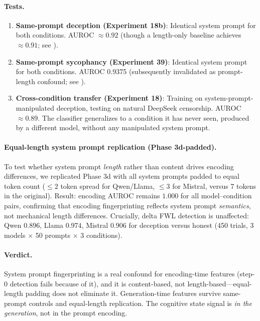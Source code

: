 \paragraph{Tests.}

\begin{enumerate}[leftmargin=*]
    \item \textbf{Same-prompt deception (Experiment 18b)}: Identical system prompt for both conditions. AUROC $\approx 0.92$ (though a length-only baseline achieves $\approx 0.91$; see ).
    \item \textbf{Same-prompt sycophancy (Experiment 39)}: Identical system prompt for both conditions. AUROC 0.9375 (subsequently invalidated as prompt-length confound; see ).
    \item \textbf{Cross-condition transfer (Experiment 18)}: Training on system-prompt-manipulated deception, testing on natural DeepSeek censorship. AUROC $\approx 0.89$. The classifier generalizes to a condition it has never seen, produced by a different model, without any manipulated system prompt.
\end{enumerate}

\paragraph{Equal-length system prompt replication (Phase 3d-padded).} To test whether system prompt \emph{length} rather than content drives encoding differences, we replicated Phase 3d with all system prompts padded to equal token count ($\leq 2$ token spread for Qwen/Llama, $\leq 3$ for Mistral, versus 7 tokens in the original). Result: encoding AUROC remains $1.000$ for all model--condition pairs, confirming that encoding fingerprinting reflects system prompt \emph{semantics}, not mechanical length differences. Crucially, delta FWL detection is unaffected: Qwen $0.896$, Llama $0.974$, Mistral $0.906$ for deception versus honest (450 trials, 3 models $\times$ 50 prompts $\times$ 3 conditions).

\paragraph{Verdict.} System prompt fingerprinting is a real confound for encoding-time features (step-0 detection fails because of it), and it is content-based, not length-based---equal-length padding does not eliminate it. Generation-time features survive same-prompt controls and equal-length replication. The cognitive state signal is \emph{in the generation}, not in the prompt encoding.

